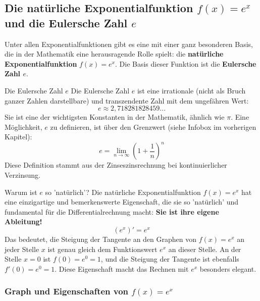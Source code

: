 \subsection{Die natürliche Exponentialfunktion $f(x) = e^x$ und die Eulersche Zahl $e$}
\label{subsec:natuerliche_exp_funktion}

Unter allen Exponentialfunktionen gibt es eine mit einer ganz besonderen Basis, die in der Mathematik eine herausragende Rolle spielt: die \textbf{natürliche Exponentialfunktion} $f(x) = e^x$. Die Basis dieser Funktion ist die \textbf{Eulersche Zahl $e$}.

\begin{merksatzumgebung}{Die Eulersche Zahl $e$}
Die Eulersche Zahl $e$ ist eine irrationale (nicht als Bruch ganzer Zahlen darstellbare) und transzendente Zahl mit dem ungefähren Wert:
\[ e \approx 2,718281828459... \]
Sie ist eine der wichtigsten Konstanten in der Mathematik, ähnlich wie $\pi$.
Eine Möglichkeit, $e$ zu definieren, ist über den Grenzwert (siehe Infobox im vorherigen Kapitel):
\[ e = \lim_{n \to \infty} \left(1 + \frac{1}{n}\right)^n \]
Diese Definition stammt aus der Zinseszinsrechnung bei kontinuierlicher Verzinsung.
\end{merksatzumgebung}

\begin{infoboxumgebung}{Warum ist $e$ so 'natürlich'?}
Die natürliche Exponentialfunktion $f(x)=e^x$ hat eine einzigartige und bemerkenswerte Eigenschaft, die sie so 'natürlich' und fundamental für die Differentialrechnung macht: \textbf{Sie ist ihre eigene Ableitung!}
\[ (e^x)' = e^x \]
Das bedeutet, die Steigung der Tangente an den Graphen von $f(x)=e^x$ an jeder Stelle $x$ ist genau gleich dem Funktionswert $e^x$ an dieser Stelle. An der Stelle $x=0$ ist $f(0)=e^0=1$, und die Steigung der Tangente ist ebenfalls $f'(0)=e^0=1$.
Diese Eigenschaft macht das Rechnen mit $e^x$ besonders elegant.
\end{infoboxumgebung}

\subsubsection{Graph und Eigenschaften von $f(x)=e^x$}

